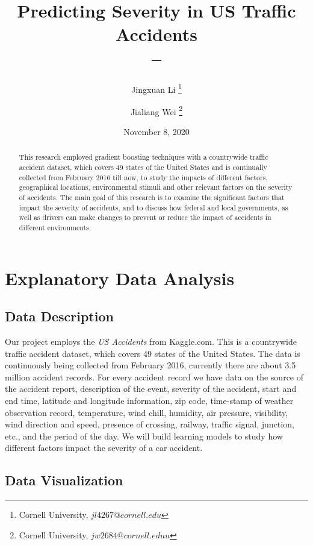 \documentclass[twocolumn]{article}
\title{Predicting Severity in US Traffic Accidents \\ -- }
\author{Jingxuan Li \footnote{Cornell University, $jl4267@cornell.edu$} \and Jialiang Wei \footnote{Cornell University, $jw2684@cornell.eduu$}}
\date{November 8, 2020}
\begin{document}
\begin{titlepage}
\maketitle
\thispagestyle{empty}
\bigskip
\begin{abstract}
This research employed gradient boosting techniques with a countrywide traffic accident dataset, which covers 49 states of the United States and is continually collected from February 2016 till now, to study the impacts of different factors, geographical locations, environmental stimuli and other relevant factors on the severity of accidents. The main goal of this research is to examine the significant factors that impact the severity of accidents, and to discuss how federal and local governments, as well as drivers can make changes to prevent or reduce the impact of accidents in different environments.

\end{abstract}
\clearpage
{}
\end{titlepage}



\section{Explanatory Data Analysis}

\subsection{Data Description}
Our project employs the \textit{US Accidents} from Kaggle.com. This is a countrywide traffic accident dataset, which covers 49 states of the United
States. The data is continuously being collected from February 2016, currently there
are about 3.5 million accident records. For every accident record we
have data on the source of the accident report, description of the event,
severity of the accident, start and end time, latitude and longitude information, zip code, time-stamp of weather observation record,
temperature, wind chill, humidity, air pressure, visibility, wind direction and speed,
presence of crossing, railway, traffic signal, junction, etc., and the period of the day.
We will build learning models to study how different factors impact the severity of a car accident.

\subsection{Data Visualization}
\end{document}
